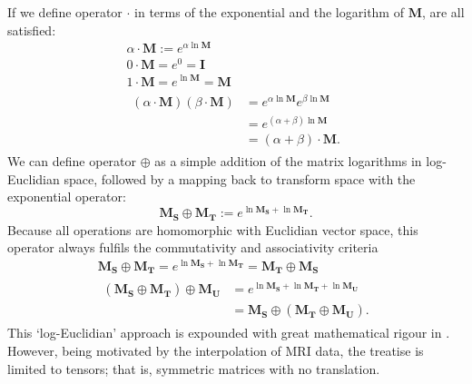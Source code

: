         If we define operator $\cdot$ in terms of the exponential and the logarithm of $\mathbf{M}$,  are all satisfied:
        \begin{gather}
          \alpha \cdot \mathbf{M} := e^{\alpha\ln\mathbf{M}} \\
          0 \cdot \mathbf{M} = e^0 = \mathbf{I} \\
          1 \cdot \mathbf{M} = e^{\ln\mathbf{M}} = \mathbf{M} \\
          \begin{split}
            (\alpha \cdot \mathbf{M})(\beta \cdot \mathbf{M}) &= e^{\alpha\ln\mathbf{M}}e^{\beta\ln\mathbf{M}} \\
                                                              &= e^{(\alpha + \beta)\ln\mathbf{M}} \\
                                                              &= (\alpha + \beta) \cdot \mathbf{M}.
          \end{split}
        \end{gather}
        We can define operator $\oplus$ as a simple addition of the matrix logarithms in log-Euclidian space, followed by a mapping back to transform space with the exponential operator:
        \begin{equation}
          \mathbf{M_S} \oplus \mathbf{M_T} := e^{\ln\mathbf{M_S} + \ln\mathbf{M_T}}.
        \end{equation}
        Because all operations are homomorphic with Euclidian vector space, this operator always fulfils the commutativity and associativity criteria
        \begin{gather}
          \mathbf{M_S} \oplus \mathbf{M_T} = e^{\ln\mathbf{M_S} + \ln\mathbf{M_T}} = \mathbf{M_T} \oplus \mathbf{M_S} \\
          \begin{split}
            (\mathbf{M_S}\oplus\mathbf{M_T})\oplus\mathbf{M_U} &= e^{\ln\mathbf{M_S} + \ln\mathbf{M_T} + \ln\mathbf{M_U}} \\
                                                               &= \mathbf{M_S}\oplus(\mathbf{M_T}\oplus\mathbf{M_U}).
          \end{split}
        \end{gather}
        This `log-Euclidian' approach is expounded with great mathematical rigour in \cite{Arsigny2005}. However, being motivated by the interpolation of MRI data, the treatise is limited to tensors; that is, symmetric matrices with no translation.
        

